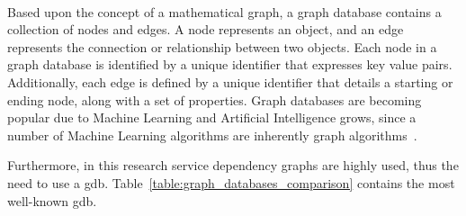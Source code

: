 \,

Based upon the concept of a mathematical graph, a graph database contains a collection of nodes and edges. A node represents an object, and an edge represents the connection or relationship between two objects. Each node in a graph database is identified by a unique identifier that expresses key value pairs. Additionally, each edge is defined by a unique identifier that details a starting or ending node, along with a set of properties. Graph databases are becoming popular due to Machine Learning and Artificial Intelligence grows, since a number of Machine Learning algorithms are inherently graph algorithms~\cite{FavioVazquez2019}.

Furthermore, in this research service dependency graphs are highly used, thus the need to use a \gls{gdb}. Table~\ref{table:graph_databases_comparison} contains the most well-known \gls{gdb}.

